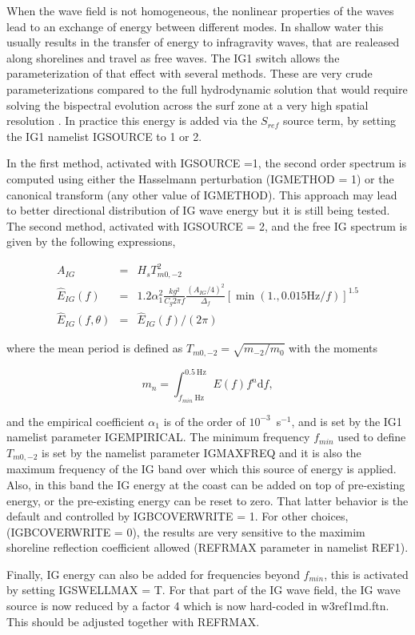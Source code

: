 When the wave field is not homogeneous, the nonlinear properties of the waves
lead to an exchange of energy between different modes. In shallow water this
usually results in the transfer of energy to infragravity waves, that are
realeased along shorelines and travel as free waves. The {\code IG1} switch
allows the parameterization of that effect with several methods.  These are
very crude parameterizations compared to the full hydrodynamic solution that
would require solving the bispectral evolution across the surf zone at a very
high spatial resolution \citep[e.g.][]{art:HB97}.  In practice this energy is
added via the $S_{ref}$ source term, by setting the {\code IG1} namelist
{\code IGSOURCE} to 1 or 2.

In the first method, activated with {\code IGSOURCE =1}, the second order
spectrum is computed using either the Hasselmann perturbation ({\code IGMETHOD
= 1}) or the canonical transform (any other value of {\code IGMETHOD}). This
approach may lead to better directional distribution of IG wave energy but it
is still being tested.  The second method, activated with {\code IGSOURCE =
2}, and the free IG spectrum is given by the following expressions,

\begin{eqnarray}
 A_{IG} & =&    H_s T_{m0,-2}^2\label{eq:IGfit0} \\
\widehat{E}_{IG}(f)& = & 1.2 \alpha_1^2 \frac{k g^2}{C_g 2 \pi f} \frac{(A_{IG}/4)^2}{\Delta_f}  
\left[\min( 1., 0.015\mathrm{Hz}/ f)\right]^{1.5} \label{eq:IGfit1} \\
 \widehat{E}_{IG}(f,\theta) & = & \widehat{E}_{IG}(f) / (2 \pi )
\label{eq:fit2} 
\end{eqnarray}

\noindent
where the mean period is defined as $ T_{m0,-2} =\sqrt{m_{-2}/m_{0}}$ with the
moments

\begin{equation}
 m_n= \int_{f_{min}~\mathrm{Hz}}^{0.5~\mathrm{Hz}} E(f) f^n {\mathrm d}f,\label{eq:mn}
\end{equation}

\noindent
and the empirical coefficient $\alpha_1$ is of the order of
$10^{-3}$~s$^{-1}$, and is set by the IG1 namelist parameter {\code
IGEMPIRICAL}. The minimum frequency $f_{min}$ used to define $ T_{m0,-2}$ is
set by the namelist parameter {\code IGMAXFREQ} and it is also the maximum
frequency of the IG band over which this source of energy is applied.  Also,
in this band the IG energy at the coast can be added on top of pre-existing
energy, or the pre-existing energy can be reset to zero. That latter behavior
is the default and controlled by {\code IGBCOVERWRITE = 1}. For other choices,
({\code IGBCOVERWRITE = 0}), the results are very sensitive to the maximim
shoreline reflection coefficient allowed ({\code REFRMAX} parameter in
namelist {\code REF1}).

Finally, IG energy can also be added for frequencies beyond $f_{min}$, this is
activated by setting {\code IGSWELLMAX = T}.  For that part of the IG wave
field, the IG wave source is now reduced by a factor 4 which is now hard-coded
in {\file w3ref1md.ftn}. This should be adjusted together with {\code
REFRMAX}.




